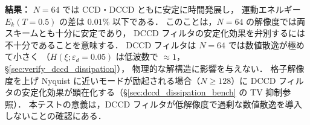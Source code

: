 \textbf{結果：}
$N=64$ では CCD・DCCD ともに安定に時間発展し，
運動エネルギー $E_k(T=0.5)$ の差は $0.01\%$ 以下である．
このことは，$N=64$ の解像度では両スキームとも十分に安定であり，
DCCD フィルタの安定化効果を弁別するには不十分であることを意味する．
DCCD フィルタは $N=64$ では数値散逸が極めて小さく
（$H(\xi; \varepsilon_d=0.05)$ は低波数で $\approx 1$，§\ref{sec:verify_dccd_dissipation}），
物理的な解構造に影響を与えない．
格子解像度を上げ Nyquist に近いモードが励起される場合（$N \geq 128$）に
DCCD フィルタの安定化効果が顕在化する（§\ref{sec:dccd_dissipation_bench} の TV 抑制参照）．
本テストの意義は，DCCD フィルタが低解像度で過剰な数値散逸を導入しないことの確認にある．
